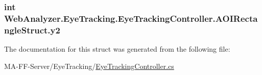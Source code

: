 \subsubsection[{y2}]{\setlength{\rightskip}{0pt plus 5cm}int Web\+Analyzer.\+Eye\+Tracking.\+Eye\+Tracking\+Controller.\+A\+O\+I\+Rectangle\+Struct.\+y2}\label{struct_web_analyzer_1_1_eye_tracking_1_1_eye_tracking_controller_1_1_a_o_i_rectangle_struct_a6a8077e37dbbe0209d058b8d8dde3e46}


The documentation for this struct was generated from the following file\+:\begin{DoxyCompactItemize}
\item 
M\+A-\/\+F\+F-\/\+Server/\+Eye\+Tracking/\hyperlink{_eye_tracking_controller_8cs}{Eye\+Tracking\+Controller.\+cs}\end{DoxyCompactItemize}
